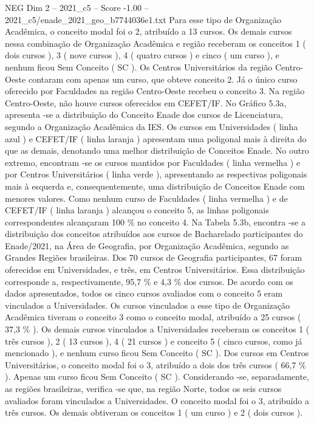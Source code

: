 \begin{textsample}{NEG Dim 2 – 2021\_c5 – Score -1.00 – 2021\_c5/enade\_2021\_geo\_b7744036e1.txt}
Para esse tipo de Organização Acadêmica, o conceito modal foi o 2, atribuído a 13 cursos.
Os demais cursos nessa combinação de Organização Acadêmica e região receberam os conceitos 1 ( dois cursos ), 3 ( nove cursos ), 4 ( quatro cursos ) e cinco ( um curso ), e nenhum ficou Sem Conceito ( SC ).
Os Centros Universitários da região Centro-Oeste contaram com apenas um curso, que obteve conceito 2.
Já o único curso oferecido por Faculdades na região Centro-Oeste recebeu o conceito 3.
Na região Centro-Oeste, não houve cursos oferecidos em CEFET/IF.
No Gráfico 5.3a, apresenta -se a distribuição do Conceito Enade dos cursos de Licenciatura, segundo a Organização Acadêmica da IES.
Os cursos em Universidades ( linha azul ) e CEFET/IF ( linha laranja ) apresentam uma poligonal mais à direita do que as demais, denotando uma melhor distribuição de Conceitos Enade.
No outro extremo, encontram -se os cursos mantidos por Faculdades ( linha vermelha ) e por Centros Universitários ( linha verde ), apresentando as respectivas poligonais mais à esquerda e, consequentemente, uma distribuição de Conceitos Enade com menores valores.
Como nenhum curso de Faculdades ( linha vermelha ) e de CEFET/IF ( linha laranja ) alcançou o conceito 5, as linhas poligonais correspondentes alcançaram 100 \% no conceito 4.
Na Tabela 5.3b, encontra -se a distribuição dos conceitos atribuídos aos cursos de Bacharelado participantes do Enade/2021, na Área de Geografia, por Organização Acadêmica, segundo as Grandes Regiões brasileiras.
Dos 70 cursos de Geografia participantes, 67 foram oferecidos em Universidades, e três, em Centros Universitários.
Essa distribuição corresponde a, respectivamente, 95,7 \% e 4,3 \% dos cursos.
De acordo com os dados apresentados, todos os cinco cursos avaliados com o conceito 5 eram vinculados a Universidades.
Os cursos vinculados a esse tipo de Organização Acadêmica tiveram o conceito 3 como o conceito modal, atribuído a 25 cursos ( 37,3 \% ).
Os demais cursos vinculados a Universidades receberam os conceitos 1 ( três cursos ), 2 ( 13 cursos ), 4 ( 21 cursos ) e conceito 5 ( cinco cursos, como já mencionado ), e nenhum curso ficou Sem Conceito ( SC ).
Dos cursos em Centros Universitários, o conceito modal foi o 3, atribuído a dois dos três cursos ( 66,7 \% ).
Apenas um curso ficou Sem Conceito ( SC ).
Considerando -se, separadamente, as regiões brasileiras, verifica -se que, na região Norte, todos os seis cursos avaliados foram vinculados a Universidades.
O conceito modal foi o 3, atribuído a três cursos.
Os demais obtiveram os conceitos 1 ( um curso ) e 2 ( dois cursos ).

\end{textsample}
